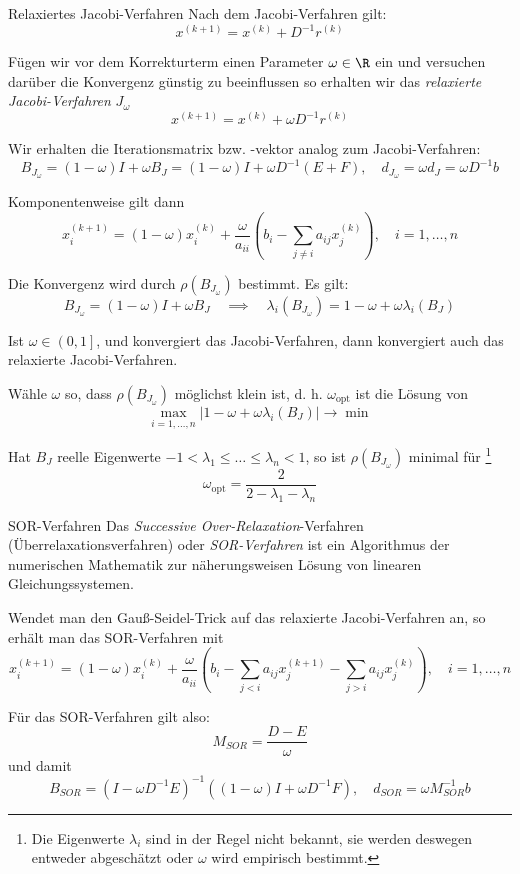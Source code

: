 \begin{defi}{Relaxiertes Jacobi-Verfahren}
    Nach dem Jacobi-Verfahren gilt:
    \[
        x^{(k+1)} = x^{(k)} + D^{-1} r^{(k)}
    \]

    Fügen wir vor dem Korrekturterm einen Parameter $\omega \in \R$ ein und versuchen darüber die Konvergenz günstig zu beeinflussen so erhalten wir das \emph{relaxierte Jacobi-Verfahren} $J_{\omega}$
    \[
        x^{(k+1)} = x^{(k)} + \omega D^{-1} r^{(k)}
    \]

    Wir erhalten die Iterationsmatrix bzw. -vektor analog zum Jacobi-Verfahren:
    \[
        B_{J_{\omega}} = (1 - \omega) I + \omega B_{J} =  (1 - \omega) I + \omega D^{-1} (E + F), \quad d_{J_{\omega}} = \omega d_{J} = \omega D^{-1} b
    \]

    Komponentenweise gilt dann
    \[
        x_i^{(k+1)} = (1 - \omega) x_i^{(k)} + \frac{\omega}{a_{ii}} \left( b_i - \sum_{j \neq i} a_{ij} x_j^{(k)} \right), \quad i = 1, \ldots, n
    \]

    Die Konvergenz wird durch $\rho(B_{J_{\omega}})$ bestimmt.
    Es gilt:
    \[
        B_{J_{\omega}} = (1 - \omega) I + \omega B_{J} \quad \implies \quad \lambda_i(B_{J_{\omega}}) = 1 - \omega + \omega \lambda_i(B_{J})
    \]

    Ist $\omega \in \left(0, 1\right]$, und konvergiert das Jacobi-Verfahren, dann konvergiert auch das relaxierte Jacobi-Verfahren.

    Wähle $\omega$ so, dass $\rho(B_{J_{\omega}})$ möglichst klein ist, d. h. $\omega_{\text{opt}}$ ist die Lösung von
    \[
        \max_{i = 1, \ldots, n} | 1 - \omega + \omega \lambda_i(B_{J}) | \to \min
    \]

    Hat $B_{J}$ reelle Eigenwerte $-1 < \lambda_1 \leq \ldots \leq \lambda_n < 1$, so ist $\rho(B_{J_{\omega}})$ minimal für
    \footnote{Die Eigenwerte $\lambda_i$ sind in der Regel nicht bekannt, sie werden deswegen entweder abgeschätzt oder $\omega$ wird empirisch bestimmt.}
    \[
        \omega_{\text{opt}} = \frac{2}{2 - \lambda_1 - \lambda_n}
    \]
\end{defi}

\begin{defi}{SOR-Verfahren}
    Das \emph{Successive Over-Relaxation}-Verfahren (Überrelaxationsverfahren) oder \emph{SOR-Verfahren} ist ein Algorithmus der numerischen Mathematik zur näherungsweisen Lösung von linearen Gleichungssystemen.

    Wendet man den Gauß-Seidel-Trick auf das relaxierte Jacobi-Verfahren an, so erhält man das SOR-Verfahren mit
    \[
        x_i^{(k+1)} = (1 - \omega) x_i^{(k)} + \frac{\omega}{a_{ii}} \left( b_i - \sum_{j < i} a_{ij} x_j^{(k+1)} - \sum_{j > i} a_{ij} x_j^{(k)} \right), \quad i = 1, \ldots, n
    \]

    Für das SOR-Verfahren gilt also:
    \[
        M_{SOR} = \frac{D - E}{\omega}
    \]
    und damit
    \[
        B_{SOR} = (I - \omega D^{-1}E)^{-1} ((1 - \omega) I + \omega D^{-1} F), \quad d_{SOR} = \omega M_{SOR}^{-1} b
    \]
\end{defi}

